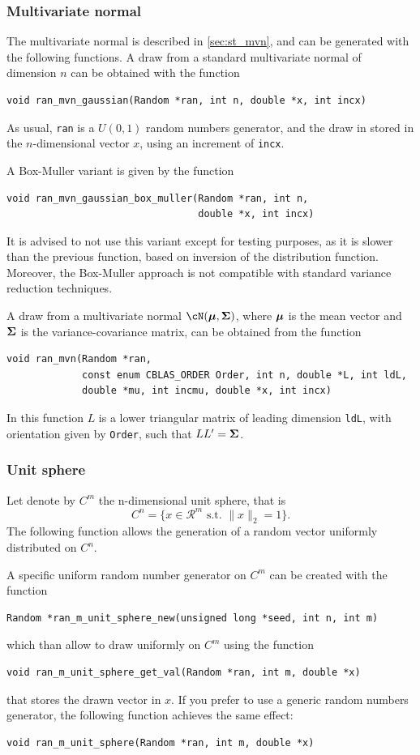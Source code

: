 \subsubsection{Multivariate normal}

The multivariate normal is described in \ref{sec:st_mvn}, and can be generated with the following functions.
A draw from a standard multivariate normal of dimension $n$ can be obtained with the function
\begin{verbatim}
void ran_mvn_gaussian(Random *ran, int n, double *x, int incx)
\end{verbatim}
As usual, \verb|ran| is a $U(0,1)$ random numbers generator, and the draw in stored in the $n$-dimensional vector $x$, using an increment of \verb|incx|.

A Box-Muller variant is given by the function
\begin{verbatim}
void ran_mvn_gaussian_box_muller(Random *ran, int n,
                                 double *x, int incx)
\end{verbatim}
It is advised to not use this variant except for testing purposes, as it is slower than the previous function, based on inversion of the distribution function. Moreover, the Box-Muller approach is not compatible with standard variance reduction techniques.

A draw from a multivariate normal $\cN(\bmu, \bSigma)$, where $\mbox{\boldmath $\mu$}$ is the mean vector and $\mbox{\boldmath $\Sigma$}$ is the variance-covariance matrix, can be obtained from the function
\begin{verbatim}
void ran_mvn(Random *ran,
             const enum CBLAS_ORDER Order, int n, double *L, int ldL,
             double *mu, int incmu, double *x, int incx)
\end{verbatim}
In this function $L$ is a lower triangular matrix of leading dimension \verb|ldL|, with orientation given by \verb|Order|, such that $LL' = \mbox{\boldmath $\Sigma$}$.


\subsubsection{Unit sphere}

Let denote by $C^m$ the n-dimensional unit sphere, that is
\[
C^n = \lbrace x \in \mathcal{R}^m \mbox{ s.t. } \|x\|_2 = 1 \rbrace.
\]
The following function allows the generation of a random vector
uniformly distributed on $C^n$.

A specific uniform random number generator on $C^m$ can be created
with the function
\begin{verbatim}
Random *ran_m_unit_sphere_new(unsigned long *seed, int n, int m)
\end{verbatim}
which than allow to draw uniformly on $C^m$ using the function
\begin{verbatim}
void ran_m_unit_sphere_get_val(Random *ran, int m, double *x)
\end{verbatim}
that stores the drawn vector in $x$.
If you prefer to use a generic random numbers generator, the following
function achieves the same effect:
\begin{verbatim}
void ran_m_unit_sphere(Random *ran, int m, double *x)
\end{verbatim}


